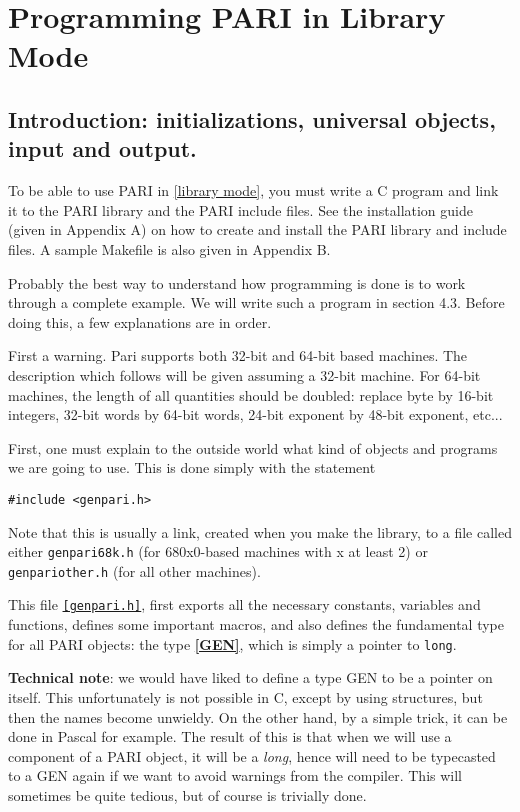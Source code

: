 \chapter{Programming PARI in Library Mode}

\section{Introduction: initializations, universal objects, input and output.}

To be able to use PARI in \ref{library mode}, you must write a C program and link it
to the PARI library and the PARI include files. See the installation guide 
(given in Appendix A) on how to create and install the PARI
library and include files. A sample Makefile is also given in Appendix B.

Probably the best way to understand how programming is done is to work
through a complete example. We will write such a program in section 4.3.
Before doing this, a few explanations are in order.

First a warning. Pari supports both 32-bit and 64-bit based machines.
The description which follows will be given assuming a 32-bit machine. For
64-bit machines, the length of all quantities should be doubled: replace
byte by 16-bit integers, 32-bit words by 64-bit words, 24-bit exponent by
48-bit exponent, etc...


First, one must explain to the outside world what kind of objects and
programs we are going to use. This is done simply with the statement

{\tt \#include <genpari.h>}

Note that this is usually a link, created when you make the library, to
a file called either {\tt genpari68k.h} (for 680x0-based machines with x at
least 2) or {\tt genpariother.h} (for all other machines).

This file {\tt \ref{genpari.h}}, first exports all the necessary constants, variables
and functions, defines some important macros, and also defines the fundamental
type for all PARI objects: the type {\bf \ref{GEN}}, which is simply
a pointer to {\tt long}.

{\bf Technical note}: we would have liked to define a type GEN to be a
pointer on itself. This unfortunately is not possible in C, except by
using structures, but then the names become unwieldy. On the other hand,
by a simple trick, it can be done in Pascal for example. The result of this
is that when we will use a component of a PARI object, it will be a {\sl long},
hence will need to be typecasted to a GEN again if we want to avoid warnings
from the compiler. This will sometimes be quite tedious, but of course is
trivially done.


